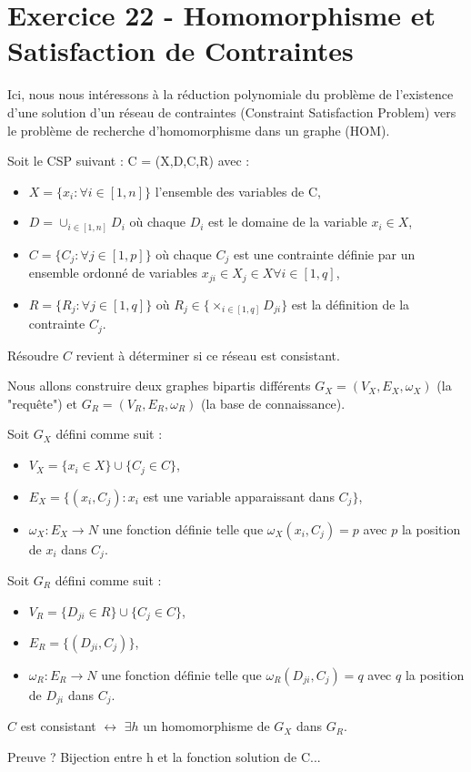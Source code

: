 
\section{Exercice 22 - Homomorphisme et Satisfaction de Contraintes}\label{ex22}
Ici, nous nous int\'eressons \`a la r\'eduction polynomiale du probl\`eme de l'existence
d'une solution d'un r\'eseau de contraintes (Constraint Satisfaction Problem)
vers le probl\`eme de recherche d'homomorphisme dans un graphe (HOM).

Soit le CSP suivant : C = (X,D,C,R) avec :
\begin{itemize}
	\item $X = \{x_i : \forall i \in [1,n]\}$ l'ensemble des variables de C,
	\item $D = \cup_{i \in [1,n]}D_i$ o\`u chaque $D_i$ est le domaine de la variable
	$x_i \in X$,
	\item $C = \{C_j : \forall j \in [1,p]\}$ o\`u chaque $C_j$ est une contrainte
	d\'efinie par un ensemble ordonn\'e de variables $x_{ji} \in X_j \in X \forall i \in
	[1,q]$,
	\item $R = \{R_j : \forall j \in [1,q]\}$ o\`u $R_j \in \{\times_{i \in [1,q]}D_{ji}\}$ est
	la d\'efinition de la contrainte $C_j$.
\end{itemize}
R\'esoudre $C$ revient \`a d\'eterminer si ce r\'eseau est consistant.

Nous allons construire deux graphes bipartis diff\'erents $G_{X} = (V_X,E_X,\omega_X)$ (la
"requ\^ete") et $G_R = (V_R,E_R,\omega_R)$ (la base de connaissance).

Soit $G_X$ d\'efini comme suit :
\begin{itemize}
	\item $V_X = \{x_i \in X\} \cup \{C_j \in C\}$,
	\item $E_X = \{(x_i,C_j) : x_i$ est une variable apparaissant dans $C_j \}$,
	\item $\omega_X : E_X \rightarrow N$ une fonction d\'efinie telle que
	$\omega_X(x_i,C_j) = p$ avec $p$ la position de $x_i$ dans $C_j$.
\end{itemize}

Soit $G_R$ d\'efini comme suit :
\begin{itemize}
	\item $V_R = \{D_{ji} \in R\} \cup \{C_j \in C\}$,
	\item $E_R = \{(D_{ji},C_j)\}$,
	\item $\omega_R : E_R \rightarrow N$ une fonction d\'efinie telle que
	$\omega_R(D_{ji},C_j) = q$ avec $q$ la position de $D_{ji}$ dans $C_j$.
\end{itemize}

$C$ est consistant $\leftrightarrow$ $\exists h$ un homomorphisme de $G_X$ dans $G_R$.

Preuve ?
Bijection entre h et la fonction solution de C...

